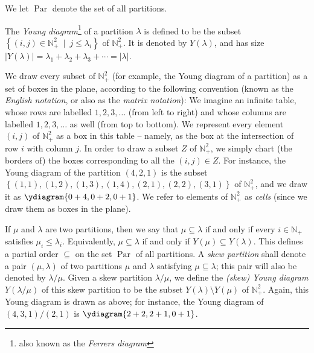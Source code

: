\documentclass[numbers=enddot,12pt,final,onecolumn,notitlepage]{scrartcl}%
\theoremstyle{definition}
\begin{document}
We let $\operatorname*{Par}$ denote the set of all partitions.

The \textit{Young diagram}\footnote{also known as the \textit{Ferrers
diagram}} of a partition $\lambda$ is defined to be the subset $\left\{
\left(  i,j\right)  \in\mathbb{N}_{+}^{2}\ \mid\ j\leq\lambda_{i}\right\}  $
of $\mathbb{N}_{+}^{2}$. It is denoted by $Y\left(  \lambda\right)  $, and has
size $\left\vert Y\left(  \lambda\right)  \right\vert =\lambda_{1}+\lambda
_{2}+\lambda_{3}+\cdots=\left\vert \lambda\right\vert $.

We draw every subset of $\mathbb{N}_{+}^{2}$ (for example, the Young diagram
of a partition) as a set of boxes in the plane, according to the following
convention (known as the \textit{English notation}, or also as the
\textit{matrix notation}): We imagine an infinite table, whose rows are
labelled $1,2,3,\ldots$ (from left to right) and whose columns are labelled
$1,2,3,\ldots$ as well (from top to bottom). We represent every element
$\left(  i,j\right)  $ of $\mathbb{N}_{+}^{2}$ as a box in this table --
namely, as the box at the intersection of row $i$ with column $j$. In order to
draw a subset $Z$ of $\mathbb{N}_{+}^{2}$, we simply chart (the borders of)
the boxes corresponding to all the $\left(  i,j\right)  \in Z$. For instance,
the Young diagram of the partition $\left(  4,2,1\right)  $ is the subset
$\left\{  \left(  1,1\right)  ,\left(  1,2\right)  ,\left(  1,3\right)
,\left(  1,4\right)  ,\left(  2,1\right)  ,\left(  2,2\right)  ,\left(
3,1\right)  \right\}  $ of $\mathbb{N}_{+}^{2}$, and we draw it as $%
\ydiagram{0+4,0+2,0+1}%
$. We refer to elements of $\mathbb{N}_{+}^{2}$ as \textit{cells} (since we
draw them as boxes in the plane).

If $\mu$ and $\lambda$ are two partitions, then we say that $\mu
\subseteq\lambda$ if and only if every $i\in\mathbb{N}_{+}$ satisfies $\mu
_{i}\leq\lambda_{i}$. Equivalently, $\mu\subseteq\lambda$ if and only if
$Y\left(  \mu\right)  \subseteq Y\left(  \lambda\right)  $. This defines a
partial order $\subseteq$ on the set $\operatorname*{Par}$ of all partitions.
A \textit{skew partition} shall denote a pair $\left(  \mu,\lambda\right)  $
of two partitions $\mu$ and $\lambda$ satisfying $\mu\subseteq\lambda$; this
pair will also be denoted by $\lambda/\mu$. Given a skew partition
$\lambda/\mu$, we define the \textit{(skew) Young diagram} $Y\left(
\lambda/\mu\right)  $ of this skew partition to be the subset $Y\left(
\lambda\right)  \setminus Y\left(  \mu\right)  $ of $\mathbb{N}_{+}^{2}$.
Again, this Young diagram is drawn as above; for instance, the Young diagram
of $\left(  4,3,1\right)  /\left(  2,1\right)  $ is $%
\ydiagram{2+2,2+1,0+1}%
$.
\end{document}
